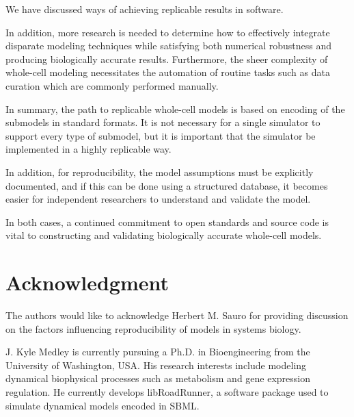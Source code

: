\documentclass[journal,transmag,twoside]{IEEEtran}
\begin{document}
We have discussed ways of achieving replicable results in software.

In addition, more research is needed to determine how to effectively integrate disparate
modeling techniques while satisfying both numerical robustness and producing
biologically accurate results. Furthermore, the sheer complexity of whole-cell modeling necessitates 
the automation of routine tasks such as data curation which are commonly performed manually.

In summary, the path to replicable whole-cell models is based on
encoding of the submodels in standard formats. It is not necessary for a single simulator
to support every type of submodel, but it is important that the simulator
be implemented in a highly replicable way.

In addition, for reproducibility, the model assumptions must be explicitly
documented, and if this can be done using a structured database,
it becomes easier for independent researchers to understand and validate the model.

In both cases, a continued commitment to open standards and source code is vital
to constructing and validating biologically accurate whole-cell models.

\section{Acknowledgment}

The authors would like to acknowledge Herbert M. Sauro for providing discussion
on the factors influencing reproducibility of models in systems biology.


\ifCLASSOPTIONcaptionsoff
  \newpage
\fi




\begin{IEEEbiography}{J. Kyle Medley}
is currently pursuing a Ph.D. in Bioengineering from the University of Washington, USA.
His research interests include modeling dynamical biophysical processes such as
metabolism and gene expression regulation.
He currently develops libRoadRunner, a software package used to simulate dynamical models encoded in SBML.
\end{IEEEbiography}
\end{document}
